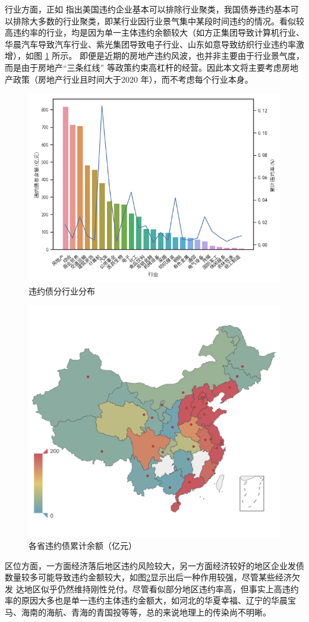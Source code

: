 行业方面，正如\Textcite{azizpour2018exploring} 指出美国违约企业基本可以排除行业聚类，我国债券违约基本可以排除大多数的行业聚类，即某行业因行业景气集中某段时间违约的情况。看似较高违约率的行业，均是因为单一主体违约余额较大（如方正集团导致计算机行业、华晨汽车导致汽车行业、紫光集团导致电子行业、山东如意导致纺织行业违约率激增），如图  \ref{fig:industry} 所示。
即便是近期的房地产违约风波，也并非主要由于行业景气度，而是由于房地产“三条红线” 等政策约束高杠杆的经营。因此本文将主要考虑房地产政策（房地产行业且时间大于2020 年），而不考虑每个行业本身。
\begin{figure}[ht]
	\centering
	\includegraphics[width=.9\linewidth]{./data/industry.png}
	\caption{\label{fig:industry}违约债分行业分布}
\end{figure}

\begin{figure}[ht]
	\centering
	\includegraphics[width=.9\linewidth]{./data/default_by_geo.png}
	\caption{\label{fig:geo}各省违约债累计余额（亿元）}
\end{figure}
区位方面，一方面经济落后地区违约风险较大，另一方面经济较好的地区企业发债数量较多可能导致违约金额较大，如图\ref{fig:geo}显示出后一种作用较强，尽管某些经济欠发 达地区似乎仍然维持刚性兑付。尽管看似部分地区违约率高，但事实上高违约率的原因大多也是单一违约主体违约金额大，如河北的华夏幸福、辽宁的华晨宝马、海南的海航、青海的青国投等等，总的来说地理上的传染尚不明晰。

